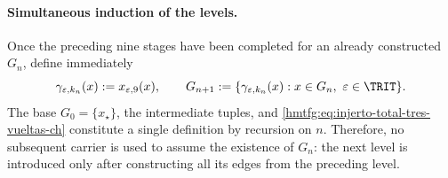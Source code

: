 \paragraph{Simultaneous induction of the levels.}
Once the preceding nine stages have been completed for an already constructed
\(G_n\), define immediately
\begin{equation}
 \gamma_{\varepsilon,k_n}(x):=x_{\varepsilon,9}(x),\qquad
 G_{n+1}:=\{\gamma_{\varepsilon,k_n}(x):
       x\in G_n,\ \varepsilon\in\TRIT\}.
 \label{hmtfg:eq:injerto-total-tres-vueltas-ch}
\end{equation}
\label{hmtfg:eq:tres-vueltas-tpk-ch}
The base \(G_0=\{x_\star\}\), the intermediate tuples, and
\eqref{hmtfg:eq:injerto-total-tres-vueltas-ch} constitute a single definition by
recursion on \(n\). Therefore, no subsequent carrier is used to assume the
existence of \(G_n\): the next level is introduced only after constructing all
its edges from the preceding level.

